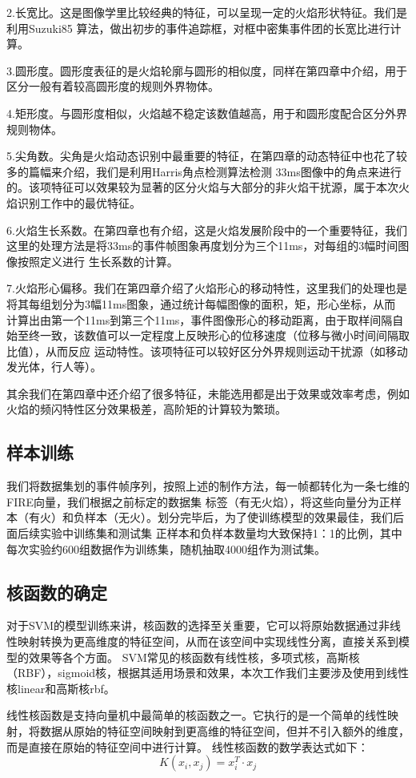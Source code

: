 2.长宽比。这是图像学里比较经典的特征，可以呈现一定的火焰形状特征。我们是利用Suzuki85 算法，做出初步的事件追踪框，对框中密集事件团的长宽比进行计算。

3.圆形度。圆形度表征的是火焰轮廓与圆形的相似度，同样在第四章中介绍，用于区分一般有着较高圆形度的规则外界物体。

4.矩形度。与圆形度相似，火焰越不稳定该数值越高，用于和圆形度配合区分外界规则物体。

5.尖角数。尖角是火焰动态识别中最重要的特征，在第四章的动态特征中也花了较多的篇幅来介绍，我们是利用Harris角点检测算法检测
33ms图像中的角点来进行的。该项特征可以效果较为显著的区分火焰与大部分的非火焰干扰源，属于本次火焰识别工作中的最优特征。

6.火焰生长系数。在第四章也有介绍，这是火焰发展阶段中的一个重要特征，我们这里的处理方法是将33ms的事件帧图象再度划分为三个11ms，对每组的3幅时间图像按照定义进行
生长系数的计算。

7.火焰形心偏移。我们在第四章介绍了火焰形心的移动特性，这里我们的处理也是将其每组划分为3幅11ms图象，通过统计每幅图像的面积，矩，形心坐标，从而
计算出由第一个11ms到第三个11ms，事件图像形心的移动距离，由于取样间隔自始至终一致，该数值可以一定程度上反映形心的位移速度（位移与微小时间间隔取比值），从而反应
运动特性。该项特征可以较好区分外界规则运动干扰源（如移动发光体，行人等）。

其余我们在第四章中还介绍了很多特征，未能选用都是出于效果或效率考虑，例如火焰的频闪特性区分效果极差，高阶矩的计算较为繁琐。
\subsection{样本训练}
我们将数据集划的事件帧序列，按照上述的制作方法，每一帧都转化为一条七维的FIRE向量，我们根据之前标定的数据集
标签（有无火焰），将这些向量分为正样本（有火）和负样本（无火）。划分完毕后，为了使训练模型的效果最佳，我们后面后续实验中训练集和测试集
正样本和负样本数量均大致保持1：1的比例，其中每次实验约600组数据作为训练集，随机抽取4000组作为测试集。
\subsection{核函数的确定}
对于SVM的模型训练来讲，核函数的选择至关重要，它可以将原始数据通过非线性映射转换为更高维度的特征空间，从而在该空间中实现线性分离，直接关系到模型的效果等各个方面。
SVM常见的核函数有线性核，多项式核，高斯核（RBF），sigmoid核，根据其适用场景和效果，本次工作我们主要涉及使用到线性核linear和高斯核rbf。

线性核函数是支持向量机中最简单的核函数之一。它执行的是一个简单的线性映射，将数据从原始的特征空间映射到更高维的特征空间，但并不引入额外的维度，而是直接在原始的特征空间中进行计算。
线性核函数的数学表达式如下：
\begin{equation} 
    K(x_i,x_j)=x_i^T·x_j
\end{equation}

